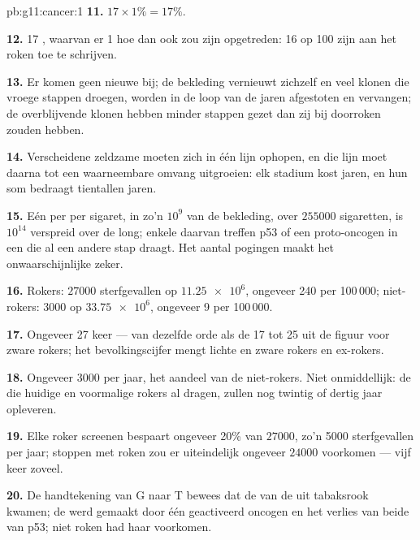 \begin{solution}{pb:g11:cancer:1}
\textbf{11.} $17 \times 1\% = 17\%$.

\textbf{12.} 17 , waarvan er 1 hoe dan ook zou zijn opgetreden: 16
op 100 zijn aan het roken toe te schrijven.

\textbf{13.} Er komen geen nieuwe  bij; de bekleding vernieuwt
zichzelf en veel klonen die vroege stappen droegen, worden in de loop van
de jaren afgestoten en vervangen; de overblijvende klonen hebben minder
stappen gezet dan zij bij doorroken zouden hebben.

\textbf{14.} Verscheidene zeldzame  moeten zich in één lijn
ophopen, en die lijn moet daarna tot een waarneembare omvang uitgroeien:
elk stadium kost jaren, en hun som bedraagt tientallen jaren.

\textbf{15.} Eén  per  per sigaret, in zo'n $10^9$  van de
bekleding, over $\num{255000}$ sigaretten, is $10^{14}$  verspreid
over de long; enkele daarvan treffen p53 of een proto-oncogen in een 
die al een andere stap draagt. Het aantal pogingen maakt het
onwaarschijnlijke zeker.

\textbf{16.} Rokers: $\num{27000}$ sterfgevallen op $\num{11.25e6}$,
ongeveer 240 per 100\,000; niet-rokers: 3000 op $\num{33.75e6}$, ongeveer
9 per 100\,000.

\textbf{17.} Ongeveer 27 keer --- van dezelfde orde als de 17 tot 25 uit
de figuur voor zware rokers; het bevolkingscijfer mengt lichte en zware
rokers en ex-rokers.

\textbf{18.} Ongeveer 3000 per jaar, het aandeel van de niet-rokers. Niet
onmiddellijk: de  die huidige en voormalige rokers al dragen,
zullen nog twintig of dertig jaar  opleveren.

\textbf{19.} Elke roker screenen bespaart ongeveer 20\% van
$\num{27000}$, zo'n 5000 sterfgevallen per jaar; stoppen met roken zou er
uiteindelijk ongeveer $\num{24000}$ voorkomen --- vijf keer zoveel.

\textbf{20.} De handtekening van G naar T bewees dat de  van de
 uit tabaksrook kwamen; de  werd gemaakt door één geactiveerd
oncogen en het verlies van beide  van p53; niet roken had haar
voorkomen.
\end{solution}
